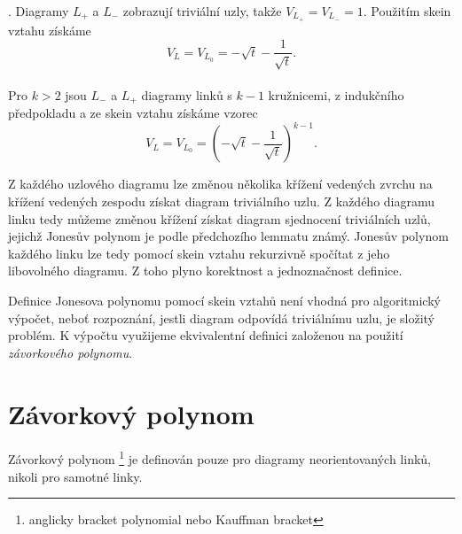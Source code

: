 \begin{dukaz}
. Diagramy $L_+$ a $L_-$ zobrazují triviální uzly, takže $V_{L_+} = V_{L_-} = 1$. Použitím skein vztahu získáme $$V_ L = V_{L_0} = - \sqrt{t} -\frac{1}{\sqrt{t}} .$$ \\
Pro $k > 2$ jsou $L_-$ a $L_+ $ diagramy linků s $k-1$ kružnicemi, z indukčního předpokladu a ze skein vztahu získáme vzorec $$V_ L = V_{L_0} = (- \sqrt{t} -\frac{1}{\sqrt{t}} )^{k-1}.$$
\end{dukaz}  

\begin{pozn}
Z každého uzlového diagramu lze změnou několika křížení vedených zvrchu na křížení vedených zespodu získat diagram triviálního uzlu. Z každého diagramu linku tedy můžeme změnou křížení získat diagram sjednocení triviálních uzlů, jejichž Jonesův polynom je podle předchozího lemmatu známý. Jonesův polynom každého linku lze tedy pomocí skein vztahu rekurzivně spočítat z jeho libovolného diagramu. Z toho plyno korektnost a jednoznačnost definice.
\end{pozn}


Definice Jonesova polynomu pomocí skein vztahů není vhodná pro algoritmický výpočet, neboť rozpoznání, jestli diagram odpovídá triviálnímu uzlu, je složitý problém. K výpočtu využijeme ekvivalentní definici založenou na použití \emph{závorkového polynomu}.

\section{Závorkový polynom}
Závorkový polynom \footnote{anglicky bracket polynomial nebo Kauffman bracket} je definován pouze pro diagramy neorientovaných linků, nikoli pro samotné linky.

